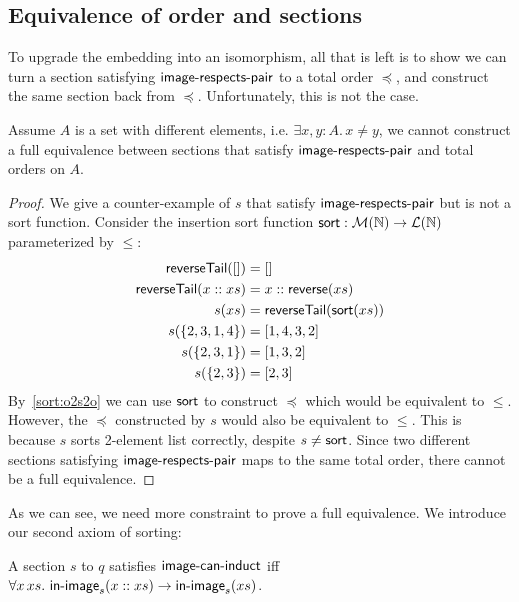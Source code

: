 \subsection{Equivalence of order and sections}
To upgrade the embedding into an isomorphism, all that is left
is to show we can turn a section satisfying $\operatorname{\mathsf{image-respects-pair}}$ to a total order $\preccurlyeq$, and construct the
same section back from $\preccurlyeq$. Unfortunately, this is not the case.

\begin{proposition}
    Assume $A$ is a set with different elements, i.e. $\exists x, y: A.\,x \neq y$,
    we cannot construct a full equivalence between sections that satisfy $\operatorname{\mathsf{image-respects-pair}}$
    and total orders on $A$.
\end{proposition}

\begin{proof}
    We give a counter-example of $s$ that satisfy $\operatorname{\mathsf{image-respects-pair}}$ but is not a sort function.
    Consider the insertion sort function $\operatorname{\mathsf{sort}} : \mathcal{M}(\mathbb{N}) \to \mathcal{L}(\mathbb{N})$
    parameterized by $\leq$:
    \begin{align*}
    \operatorname{\mathsf{reverseTail}}([]) & = [] \\
    \operatorname{\mathsf{reverseTail}}(x :: xs) & = x :: \operatorname{\mathsf{reverse}}(xs) \\
    s(xs) & = \operatorname{\mathsf{reverseTail}}(\operatorname{\mathsf{sort}}(xs)) \\
    s(\{2,3,1,4\}) & = [1,4,3,2] \\
    s(\{2,3,1\}) & = [1, 3, 2] \\
    s(\{2,3\}) & = [2, 3] \\
    \end{align*}
    By~\cref{sort:o2s2o} we can use $\operatorname{\mathsf{sort}}$ to construct $\preccurlyeq$ which would be
    equivalent to $\leq$. However, the $\preccurlyeq$ constructed by $s$ would also be equivalent
    to $\leq$. This is because $s$ sorts 2-element list correctly, despite $s \neq \operatorname{\mathsf{sort}}$.
    Since two different sections satisfying $\operatorname{\mathsf{image-respects-pair}}$ maps to the same total order,
    there cannot be a full equivalence.
\end{proof}

As we can see, we need more constraint to prove a full equivalence.
We introduce our second axiom of sorting:
\begin{definition}
    A section $s$ to $q$ satisfies $\operatorname{\mathsf{image-can-induct}}$ iff
    $\forall x\,xs.\,\operatorname{\mathsf{in-image}}_s(x :: xs) \to \operatorname{\mathsf{in-image}}_s(xs)$.
\end{definition}

